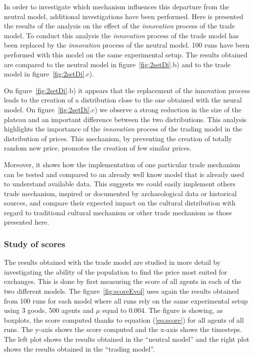 \documentclass[a4paper]{article}
\begin{document}
In order to investigate which mechanism influences this departure from the neutral model, additional investigations have been performed. Here is presented the results of the analysis on the effect of the \emph{innovation} process of the trade model. To conduct this analysis the \emph{innovation} process of the trade model has been replaced by the \emph{innovation} process of the neutral model. 100 runs have been performed with this model on the same experimental setup. The results obtained are compared to the neutral model in figure~\ref{fig:2setDi}.b) and to the trade model in figure~\ref{fig:2setDi}.c). 

On figure~\ref{fig:2setDi}.b) it appears that the replacement of the innovation process leads to the creation of a distribution close to the one obtained with the neural model. On figure~\ref{fig:2setDi}.c) we observe a strong reduction in the size of the plateau and an important difference between the two distributions. This analysis highlights the importance of the \emph{innovation} process of the trading model in the distribution of prices. This mechanism, by preventing the creation of totally random new price, promotes the creation of few similar prices.

Moreover, it shows how the implementation of one particular trade mechanism can be tested and compared to an already well know model that is already used to understand available data. This suggests we could easily implement others trade mechanism, inspired or documented by archaeological data or historical sources, and compare their expected impact on the cultural distribution with regard to traditional cultural mechanism or other trade mechanism as those presented here. 


\subsubsection{Study of scores}

The results obtained with the trade model are studied in more detail by investigating the ability of the population to find the price most suited for exchanges. This is done by first measuring the score of all agents in each of the two different models. The figure~\ref{fig:scoreEvol} uses again the results obtained from 100 runs for each model where all runs rely on the same experimental setup using 3 goods, 500 agents and $\mu$ equal to 0.004. The figure is showing, as boxplots, the score computed thanks to equation (\ref{eq:score}) for all agents of all runs. The y-axis shows the score computed and the x-axis shows the timesteps. The left plot shows the results obtained in the ``neutral model'' and the right plot shows the results obtained in the ``trading model''.
\end{document}
